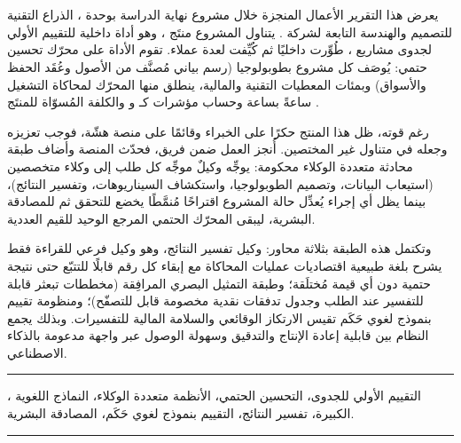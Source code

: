 \chapter*{}

\begin{RLtext}

\noindent يعرض هذا التقرير الأعمال المنجزة خلال مشروع نهاية الدراسة بوحدة ، الذراع التقنية للتصميم والهندسة التابعة لشركة . يتناول المشروع منتَج ، وهو أداة داخلية للتقييم الأولي لجدوى مشاريع ، طُوِّرت داخليًا ثم كُيِّفت لعدة عملاء. تقوم الأداة على محرّك تحسين حتمي: يُوصَف كل مشروع بطوبولوجيا (رسم بياني مُصنَّف من الأصول وعُقَد الحفظ والأسواق) وبمئات المعطيات التقنية والمالية، ينطلق منها المحرّك لمحاكاة التشغيل ساعةً بساعة وحساب مؤشرات كـ  و والكلفة المُسوّاة للمنتَج .

\noindent رغم قوته، ظل هذا المنتج حكرًا على الخبراء وقائمًا على منصة هشّة، فوجب تعزيزه وجعله في متناول غير المختصين. أُنجز العمل ضمن فريق، فحدّث المنصة وأضاف طبقة محادثة متعددة الوكلاء محكومة: يوجِّه وكيلٌ موجِّه كل طلب إلى وكلاء متخصصين (استيعاب البيانات، وتصميم الطوبولوجيا، واستكشاف السيناريوهات، وتفسير النتائج)، بينما يظل أي إجراء يُعدِّل حالة المشروع اقتراحًا مُنمَّطًا يخضع للتحقق ثم للمصادقة البشرية، ليبقى المحرّك الحتمي المرجع الوحيد للقيم العددية.

\noindent وتكتمل هذه الطبقة بثلاثة محاور: وكيل تفسير النتائج، وهو وكيل فرعي للقراءة فقط يشرح بلغة طبيعية اقتصاديات عمليات المحاكاة مع إبقاء كل رقم قابلًا للتتبّع حتى نتيجة حتمية دون أي قيمة مُختلَقة؛ وطبقة التمثيل البصري المرافِقة (مخططات تبعثر قابلة للتفسير عند الطلب وجدول تدفقات نقدية مخصومة قابل للتصفّح)؛ ومنظومة تقييم بنموذج لغوي حَكَم  تقيس الارتكاز الوقائعي والسلامة المالية للتفسيرات. وبذلك يجمع النظام بين قابلية إعادة الإنتاج والتدقيق وسهولة الوصول عبر واجهة مدعومة بالذكاء الاصطناعي.

\end{RLtext}

\noindent\rule[1pt]{\textwidth}{0.5pt}

\begin{RLtext}

، التقييم الأولي للجدوى، التحسين الحتمي، الأنظمة متعددة الوكلاء، النماذج اللغوية الكبيرة، تفسير النتائج، التقييم بنموذج لغوي حَكَم، المصادقة البشرية.
\end{RLtext}

\vspace{0.3cm}
\noindent\rule[1pt]{\textwidth}{0.5pt}

